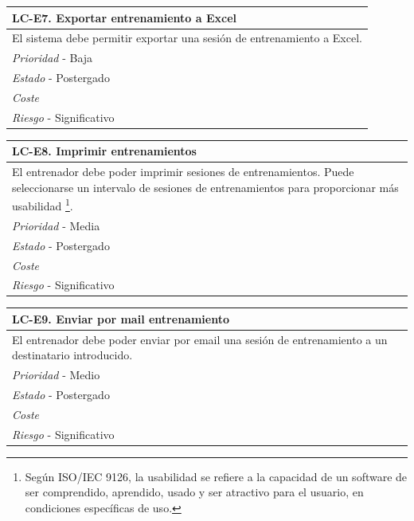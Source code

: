 	\begin{center}
		\begin{tabularx}{15cm}{|X|}
			\hline 
				\bf{LC-E7. Exportar entrenamiento a Excel}\\
			\hline
				El sistema debe permitir exportar una sesión de entrenamiento a Excel.\\
			\hline
				{\it Prioridad} - Baja\\
			\hline
				{\it Estado} - Postergado\\
			\hline
				{\it Coste}\\
			\hline
				{\it Riesgo} - Significativo\\
			\hline
		\end{tabularx}
	\end{center}
	
	\begin{center}
		\begin{tabularx}{15cm}{|X|}
			\hline 
				\bf{LC-E8. Imprimir entrenamientos}\\
			\hline
				El entrenador debe poder imprimir sesiones de entrenamientos. Puede seleccionarse un intervalo de sesiones de entrenamientos para proporcionar más usabilidad \footnote{Según ISO/IEC 9126, la usabilidad se refiere a la capacidad de un software de ser comprendido, aprendido, usado y ser atractivo para el usuario, en condiciones específicas de uso.}.\\
			\hline
				{\it Prioridad} - Media\\
			\hline
				{\it Estado} - Postergado\\
			\hline
				{\it Coste}\\
			\hline
				{\it Riesgo} - Significativo\\
			\hline
		\end{tabularx}
	\end{center}
	
	\begin{center}
		\begin{tabularx}{15cm}{|X|}
			\hline 
				\bf{LC-E9. Enviar por mail entrenamiento }\\
			\hline
				El entrenador debe poder enviar por email una sesión de entrenamiento a un destinatario introducido.\\
			\hline
				{\it Prioridad} - Medio\\
			\hline
				{\it Estado} - Postergado\\
			\hline
				{\it Coste}\\
			\hline
				{\it Riesgo} - Significativo\\
			\hline
		\end{tabularx}
	\end{center}
	

